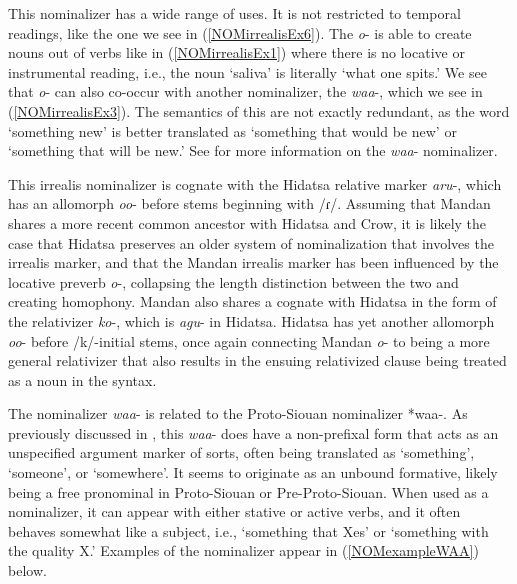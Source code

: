 This nominalizer has a wide range of uses. It is not restricted to temporal readings, like the one we see in (\ref{NOMirrealisEx6}). The \textit{o}- is able to create nouns out of verbs like in (\ref{NOMirrealisEx1}) where there is no locative or instrumental reading, i.e., the noun `saliva' is literally `what one spits.' We see that \textit{o}- can also co-occur with another nominalizer, the \textit{waa}-, which we see in (\ref{NOMirrealisEx3}). The semantics of this are not exactly redundant, as the word `something new' is better translated as `something that would be new' or `something that will be new.' See  for more information on the \textit{waa}- nominalizer.

This irrealis nominalizer is cognate with the Hidatsa relative marker \textit{aru}-, which has an allomorph \textit{oo}- before stems beginning with /ɾ/. Assuming that Mandan shares a more recent common ancestor with Hidatsa and Crow, it is likely the case that Hidatsa preserves an older system of nominalization that involves the irrealis marker, and that the Mandan irrealis marker has been influenced by the locative preverb \textit{o}-, collapsing the length distinction between the two and creating homophony. Mandan also shares a cognate with Hidatsa in the form of the relativizer \textit{ko}-, which is \textit{agu}- in Hidatsa. Hidatsa has yet another allomorph \textit{oo}- before /k/-initial stems, once again connecting Mandan \textit{o}- to being a more general relativizer that also results in the ensuing relativized clause being treated as a noun in the syntax.

\label{SubSubSubNomWaa}

The nominalizer \textit{waa}- is related to the Proto-Siouan nominalizer *waa-. As previously discussed in , this \textit{waa}- does have a non-prefixal form that acts as an unspecified argument marker of sorts, often being translated as `something', `someone', or `somewhere'. It seems to originate as an unbound formative, likely being a free pronominal in Proto-Siouan or Pre-Proto-Siouan. When used as a nominalizer, it can appear with either stative or active verbs, and it often behaves somewhat like a subject, i.e., `something that Xes' or `something with the quality X.' Examples of the nominalizer appear in (\ref{NOMexampleWAA}) below.

